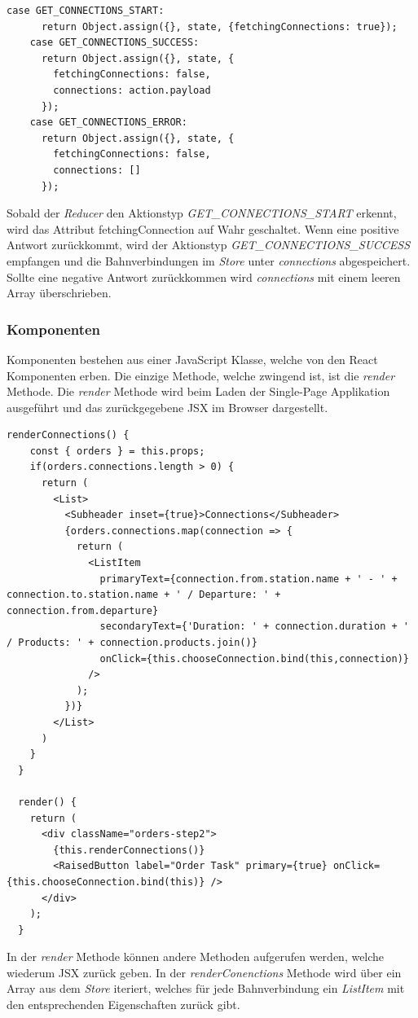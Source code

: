\begin{lstlisting}[caption=Reducer getConnections]
    case GET_CONNECTIONS_START:
      return Object.assign({}, state, {fetchingConnections: true});
    case GET_CONNECTIONS_SUCCESS:
      return Object.assign({}, state, {
        fetchingConnections: false,
        connections: action.payload
      });
    case GET_CONNECTIONS_ERROR:
      return Object.assign({}, state, {
        fetchingConnections: false,
        connections: []
      });
\end{lstlisting}

Sobald der \textit{Reducer} den Aktionstyp \textit{GET\_CONNECTIONS\_START} erkennt, wird das Attribut fetchingConnection auf Wahr geschaltet. Wenn eine positive Antwort zurückkommt, wird der Aktionstyp \textit{GET\_CONNECTIONS\_SUCCESS} empfangen und die Bahnverbindungen im \textit{Store} unter \textit{connections} abgespeichert. Sollte eine negative Antwort zurückkommen wird \textit{connections} mit einem leeren Array überschrieben.

\subsubsection{Komponenten}
Komponenten bestehen aus einer JavaScript Klasse, welche von den React Komponenten erben. Die einzige Methode, welche zwingend ist, ist die \textit{render} Methode. Die \textit{render} Methode wird beim Laden der Single-Page Applikation ausgeführt und das zurückgegebene JSX im Browser dargestellt.

\begin{lstlisting}[caption=Render Methode der OrderStep2 Komponente]
  renderConnections() {
    const { orders } = this.props;
    if(orders.connections.length > 0) {
      return (
        <List>
          <Subheader inset={true}>Connections</Subheader>
          {orders.connections.map(connection => {
            return (
              <ListItem
                primaryText={connection.from.station.name + ' - ' + connection.to.station.name + ' / Departure: ' + connection.from.departure}
                secondaryText={'Duration: ' + connection.duration + ' / Products: ' + connection.products.join()}
                onClick={this.chooseConnection.bind(this,connection)}
              />
            );
          })}
        </List>
      )
    }
  }

  render() {
    return (
      <div className="orders-step2">
        {this.renderConnections()}
        <RaisedButton label="Order Task" primary={true} onClick={this.chooseConnection.bind(this)} />
      </div>
    );
  }
\end{lstlisting}

In der \textit{render} Methode können andere Methoden aufgerufen werden, welche wiederum JSX zurück geben. In der \textit{renderConenctions} Methode wird über ein Array aus dem \textit{Store} iteriert, welches für jede Bahnverbindung ein \textit{ListItem} mit den entsprechenden Eigenschaften zurück gibt.

